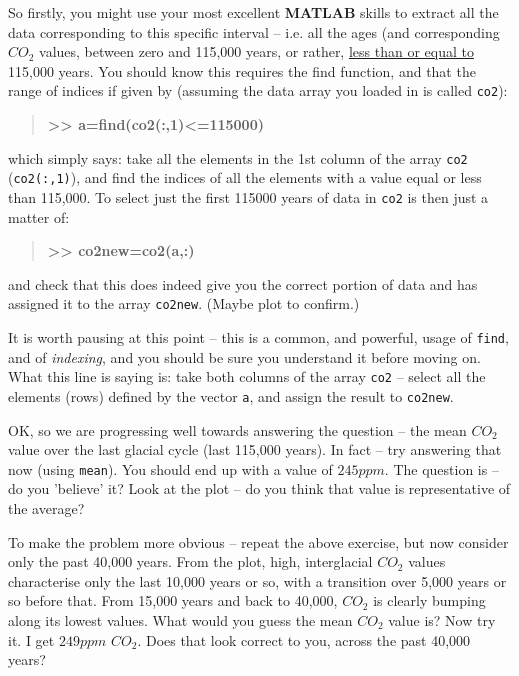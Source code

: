 \documentclass{tufte-book} %
\newenvironment{docspecbold}{\begin{quotation}\ttfamily\bfseries\parskip0pt\parindent0pt\ignorespaces}{\end{quotation}}
\begin{document}
So firstly, you might use your most excellent \textbf{MATLAB} skills to extract all the data corresponding to this specific interval -- i.e. all the ages (and corresponding \(CO_{2}\) values, between zero and 115,000 years, or rather, \uline{less than or equal to} 115,000 years. You should know this requires the find function, and that the range of indices if given by (assuming the data array you loaded in is called \texttt{co2}):
\begin{docspecbold}
>> a=find(co2(:,1)<=115000)
\end{docspecbold}
which simply says: take all the elements in the 1st column of the array \texttt{co2} (\texttt{co2(:,1)}), and find the indices of all the elements with a value equal or less than 115,000. To select just the first 115000 years of data in \texttt{co2} is then just a matter of: 
\begin{docspecbold}
>> co2new=co2(a,:)
\end{docspecbold}
and check that this does indeed give you the correct portion of data and has assigned it to the array \texttt{co2new}.
(Maybe plot to confirm.)

It is worth pausing at this point -- this is a common, and powerful, usage of \texttt{find}, and of \textit{indexing}, and you should be sure you understand it before moving on. What this line is saying is: take both columns of the array \texttt{co2} -- select all the elements (rows) defined by the vector \texttt{a}, and assign the result to \texttt{co2new}.

OK, so we are progressing well towards answering the question -- the mean \(CO_{2}\) value over the last glacial cycle (last 115,000 years). In fact -- try answering that now (using \texttt{mean}). You should end up with a value of \(245 ppm\). The question is -- do you 'believe' it? Look at the plot -- do you think that value is representative of the average?

To make the problem more obvious -- repeat the above exercise, but now consider only the past 40,000 years. From the plot, high, interglacial \(CO_{2}\) values characterise only the last 10,000 years or so, with a transition over 5,000 years or so before that. From 15,000 years and back to 40,000, \(CO_{2}\) is clearly bumping along its lowest values. What would you guess the mean \(CO_{2}\) value is? Now try it. I get \(249 ppm\) \(CO_{2}\). Does that look correct to you, across the past 40,000 years?
\end{document}
